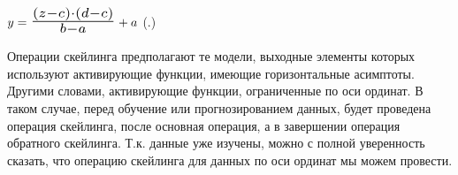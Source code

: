 {  \formulaspace \par \redline 
    $y = \scaleto{\frac{\left(z - c\right) \cdot \left(d - c\right)}{b - a}}{22pt} + a$
    \hfill (\thechaptercntr .\theformulacntr) \redline
  \formulaspace \addtocounter{formulacntr}{1}

  \par \redline Операции скейлинга предполагают те модели, выходные элементы которых используют активирующие функции, имеющие горизонтальные асимптоты. Другими словами, активирующие функции, ограниченные по оси ординат. В таком случае, перед обучение или прогнозированием данных, будет проведена операция скейлинга, после основная операция, а в завершении операция обратного скейлинга. Т.к. данные уже изучены, можно с полной уверенность сказать, что операцию скейлинга для данных по оси ординат мы можем провести. 

  \par
}

\setcounter{subchaptercntr}{1}
\setcounter{formulacntr}{1}
\setcounter{imagecntr}{1}
\setcounter{tablecntr}{1}
